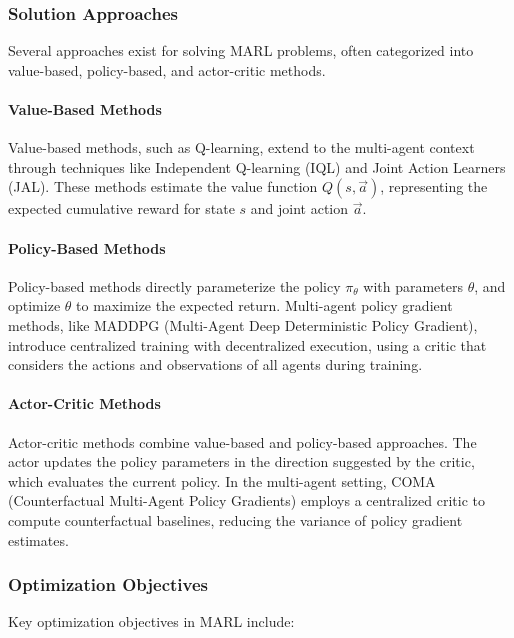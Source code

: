 \documentclass[conference]{IEEEtran}
\begin{document}
\subsubsection{Solution Approaches}

Several approaches exist for solving MARL problems, often categorized into value-based, policy-based, and actor-critic methods.

\paragraph{Value-Based Methods}

Value-based methods, such as Q-learning, extend to the multi-agent context through techniques like Independent Q-learning (IQL) and Joint Action Learners (JAL). These methods estimate the value function $Q(s, \vec{a})$, representing the expected cumulative reward for state $s$ and joint action $\vec{a}$.

\paragraph{Policy-Based Methods}

Policy-based methods directly parameterize the policy $\pi_{\theta}$ with parameters $\theta$, and optimize $\theta$ to maximize the expected return. Multi-agent policy gradient methods, like MADDPG (Multi-Agent Deep Deterministic Policy Gradient), introduce centralized training with decentralized execution, using a critic that considers the actions and observations of all agents during training.

\paragraph{Actor-Critic Methods}

Actor-critic methods combine value-based and policy-based approaches. The actor updates the policy parameters in the direction suggested by the critic, which evaluates the current policy. In the multi-agent setting, COMA (Counterfactual Multi-Agent Policy Gradients) employs a centralized critic to compute counterfactual baselines, reducing the variance of policy gradient estimates.

\subsubsection{Optimization Objectives}

Key optimization objectives in MARL include:
\end{document}
